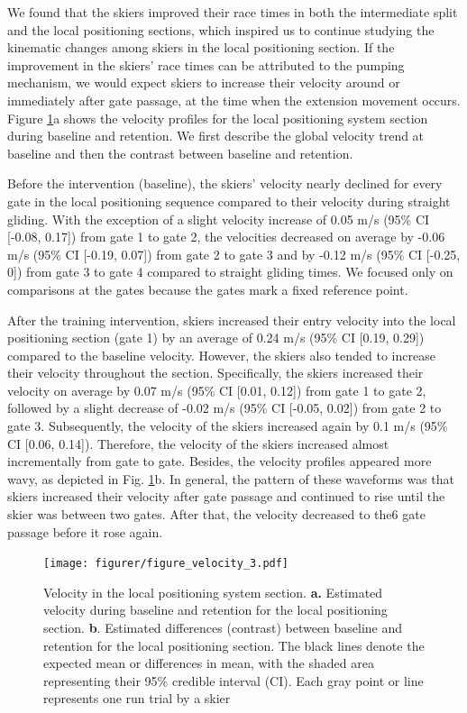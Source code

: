 We found that the skiers improved their race times in both the intermediate split and the local positioning sections, which inspired us to continue studying the kinematic changes among skiers in the local positioning section. If the improvement in the skiers' race times can be attributed to the pumping mechanism, we would expect skiers to increase their velocity around or immediately after gate passage, at the time when the extension movement occurs.  Figure \ref{fig: velocity}a shows the velocity profiles for the local positioning system section during baseline and retention. We first describe the global velocity trend at baseline and then the contrast between baseline and retention.

Before the intervention (baseline), the skiers' velocity nearly declined for every gate in the local positioning sequence compared to their velocity during straight gliding. With the exception of a slight velocity increase of 0.05 m/s (95\% CI [-0.08, 0.17]) from gate 1 to gate 2, the velocities decreased on average by -0.06 m/s (95\% CI [-0.19, 0.07]) from gate 2 to gate 3 and by -0.12 m/s (95\% CI [-0.25, 0]) from gate 3 to gate 4 compared to straight gliding times. We focused only on comparisons at the gates because the gates mark a fixed reference point. 

After the training intervention, skiers increased their entry velocity into the local positioning section (gate 1) by an average of 0.24 m/s (95\% CI [0.19, 0.29]) compared to the baseline velocity. However, the skiers also tended to increase their velocity throughout the section. Specifically, the skiers increased their velocity on average by 0.07 m/s (95\% CI [0.01, 0.12]) from gate 1 to gate 2, followed by a slight decrease of -0.02 m/s (95\% CI [-0.05, 0.02]) from gate 2 to gate 3. Subsequently, the velocity of the skiers increased again by 0.1 m/s (95\% CI [0.06, 0.14]). Therefore, the velocity of the skiers increased almost incrementally from gate to gate. Besides, the velocity profiles appeared more wavy, as depicted in Fig. \ref{fig: velocity}b. In general, the pattern of these waveforms was that skiers increased their velocity after gate passage and continued to rise until the skier was between two gates. After that, the velocity decreased to the6 gate passage before it rose again. 

\begin{figure}[H]
\centering
\texttt{[image: figurer/figure\_velocity\_3.pdf]}
\caption{Velocity in the local positioning system section. \textbf{a.} Estimated velocity during baseline and retention for the local positioning section. \textbf{b}. Estimated differences (contrast) between baseline and retention for the local positioning section. The black lines denote the expected mean or differences in mean, with the shaded area representing their 95\% credible interval (CI). Each gray point or line represents one run trial by a skier}\label{fig: velocity}
\end{figure}

